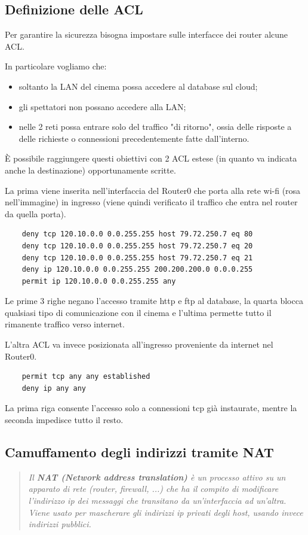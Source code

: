\documentclass{article}
\begin{document}
\subsection{Definizione delle ACL}

Per garantire la sicurezza bisogna impostare sulle interfacce dei router alcune ACL.

In particolare vogliamo che:
\begin{itemize}
    \item soltanto la LAN del cinema possa accedere al database sul cloud;
    \item gli spettatori non possano accedere alla LAN;
    \item nelle 2 reti possa entrare solo del traffico "di ritorno", ossia delle risposte a delle richieste o connessioni precedentemente fatte dall'interno.
\end{itemize} 
È possibile raggiungere questi obiettivi con 2 ACL estese (in quanto va indicata anche la destinazione) opportunamente scritte.

La prima viene inserita nell'interfaccia del Router0 che porta alla rete wi-fi (rosa nell'immagine) in ingresso (viene quindi verificato il traffico che entra nel router da quella porta).
\begin{verbatim}
    deny tcp 120.10.0.0 0.0.255.255 host 79.72.250.7 eq 80
    deny tcp 120.10.0.0 0.0.255.255 host 79.72.250.7 eq 20
    deny tcp 120.10.0.0 0.0.255.255 host 79.72.250.7 eq 21
    deny ip 120.10.0.0 0.0.255.255 200.200.200.0 0.0.0.255
    permit ip 120.10.0.0 0.0.255.255 any
\end{verbatim}
Le prime 3 righe negano l'accesso tramite http e ftp al database, la quarta blocca qualsiasi tipo di comunicazione con il cinema e l'ultima permette tutto il rimanente traffico verso internet.

L'altra ACL va invece posizionata all'ingresso proveniente da internet nel Router0.
\begin{verbatim}
    permit tcp any any established
    deny ip any any
\end{verbatim}
La prima riga consente l'accesso solo a connessioni tcp già instaurate, mentre la seconda impedisce tutto il resto.

\subsection{Camuffamento degli indirizzi tramite NAT}

\begin{quote}
    \begin{Cit}
    \textit{
    Il \textbf{NAT (Network address translation)} è un processo attivo su un apparato di rete (router, firewall, ...) che ha il compito di modificare l'indirizzo ip dei messaggi che transitano da un'interfaccia ad un'altra. Viene usato per mascherare gli indirizzi ip privati degli host, usando invece indirizzi pubblici.}
    \end{Cit}
    \end{quote}
    
\end{document}
